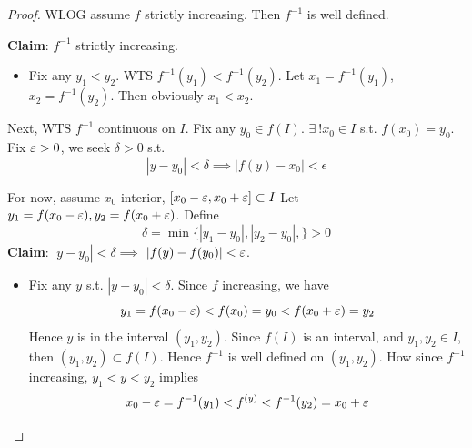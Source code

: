 \begin{proof}
    WLOG assume $f$ strictly increasing. 
    Then $f^{-1}$ is well defined. 
    \medskip

    \textbf{Claim}: $f^{-1}$ strictly increasing.
    \begin{itemize}
        \item 
    Fix any $y_1 < y_2$. WTS $f^{-1}(y_1) < f^{-1}(y_2)$.
    Let 
    $x_1 = f^{-1}(y_1)$,
    $x_2 = f^{-1}(y_2)$.
    Then obviously $x_1 < x_2$.
    \end{itemize} 

    Next, WTS $f^{-1}$ continuous on $I$.
    Fix any $y_0 \in f(I)$. 
    $\exists \ ! x_0 \in I$ s.t. 
    $f(x_0) = y_0$.
    Fix $\varepsilon > 0$, we seek $\delta > 0$
    s.t. 
    \[
        |y - y_{0}| < \delta \implies
        \left| f(y) - x_0 \right| < \epsilon
    \]

    \medskip 
    For now, 
    assume $x_0$ interior,
    $[x_0 - \varepsilon, x_0 + \varepsilon] \subset I$
    Let $y_1 = f(x_0 - \varepsilon), y_2 = f(x_0 + \varepsilon)$.
    Define 
    \[
        \delta = \min \{ 
            |y_1 - y_0|,
            |y_2 - y_0|,
        \} > 0
    \]
    \textbf{Claim}: 
    $|y - y_{0}| < \delta \implies $
    $ \left| f(y) - f(y_{0}) \right| < \varepsilon$.
    \begin{itemize}
        \item Fix any $y$ s.t. $|y - y_0| < \delta$.
        Since $f$ increasing, we have
        \[
            y_1 
            = f(x_0 - \varepsilon) 
            < f(x_0) 
            = y_0 
            < f(x_0 + \varepsilon) 
            = y_2
        \]
        Hence $y$ is in the interval 
        $(y_1, y_2)$.
        Since $f(I)$ is an interval, and
        $y_1, y_2 \in I$,
        then $(y_1, y_2) \subset f(I)$.
        Hence $f^{-1}$ is well defined on 
        $(y_1, y_2)$. 
        How since $f^{-1}$ increasing,
        $y_1 < y < y_2$ implies 
        \[
            x_0 - \varepsilon 
            = f^{-1}(y_1) 
            < f^{(y)}
            < f^{-1}(y_2)
            = x_0 + \varepsilon
        \]
    \end{itemize} 
\end{proof}











